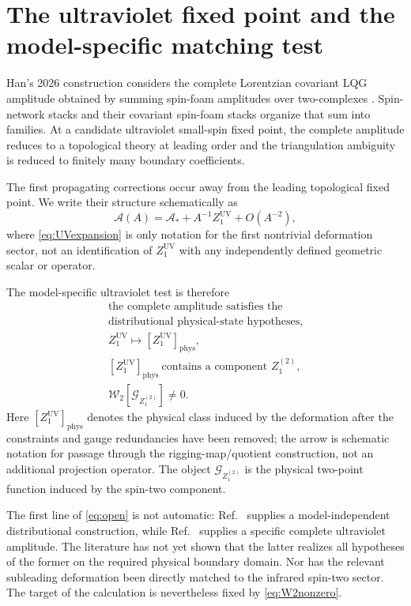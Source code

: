 \documentclass[aps,prd,reprint,nofootinbib,superscriptaddress]{revtex4-2}
\newcommand{\phys}{\mathrm{phys}}
\newcommand{\UV}{\mathrm{UV}}
\begin{document}
\section{The ultraviolet fixed point and the model-specific matching test}
\label{sec:UV}

Han's 2026 construction considers the complete Lorentzian covariant LQG amplitude obtained by summing spin-foam amplitudes over two-complexes \cite{Han2026}. Spin-network stacks and their covariant spin-foam stacks organize that sum into families. At a candidate ultraviolet small-spin fixed point, the complete amplitude reduces to a topological theory at leading order and the triangulation ambiguity is reduced to finitely many boundary coefficients.

The first propagating corrections occur away from the leading topological fixed point. We write their structure schematically as
\begin{equation}
\mathscr A(A)
=
\mathscr A_*
+A^{-1}Z_1^{\UV}
+O(A^{-2}),
\label{eq:UVexpansion}
\end{equation}
where \eqref{eq:UVexpansion} is only notation for the first nontrivial deformation sector, not an identification of $Z_1^{\UV}$ with any independently defined geometric scalar or operator.

The model-specific ultraviolet test is therefore
\begin{equation}
\boxed{
\begin{gathered}
\text{the complete amplitude satisfies the}\\
\text{distributional physical-state hypotheses},\\[1mm]
Z_1^{\UV}\longmapsto [Z_1^{\UV}]_{\phys},\\[1mm]
[Z_1^{\UV}]_{\phys}
\ \text{contains a component } Z_1^{(2)},\\[1mm]
\mathcal W_2[\mathcal G_{Z_1^{(2)}}]\neq0.
\end{gathered}}
\label{eq:open}
\end{equation}
Here $[Z_1^{\UV}]_{\phys}$ denotes the physical class induced by the deformation after the constraints and gauge redundancies have been removed; the arrow is schematic notation for passage through the rigging-map/quotient construction, not an additional projection operator. The object $\mathcal G_{Z_1^{(2)}}$ is the physical two-point function induced by the spin-two component.

The first line of \eqref{eq:open} is not automatic: Ref.~\cite{BrunoEtAl2026} supplies a model-independent distributional construction, while Ref.~\cite{Han2026} supplies a specific complete ultraviolet amplitude. The literature has not yet shown that the latter realizes all hypotheses of the former on the required physical boundary domain. Nor has the relevant subleading deformation been directly matched to the infrared spin-two sector. The target of the calculation is nevertheless fixed by \eqref{eq:W2nonzero}.
\end{document}
